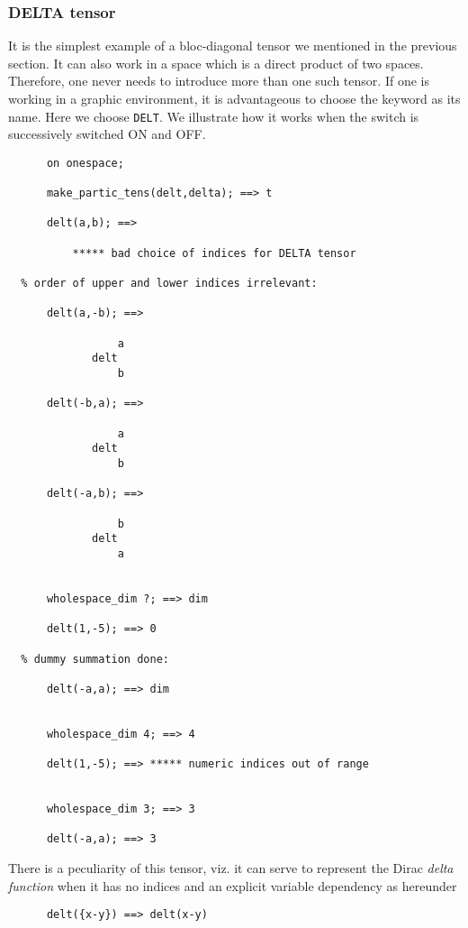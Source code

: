 \subsubsection{ DELTA tensor}
It is the simplest example of a bloc-diagonal
tensor we mentioned in the
previous section. It can also work in a space which is a direct product
of two spaces. Therefore, one never needs to introduce more than one
such tensor. If one is working in a graphic environment, it is advantageous
to choose the keyword as its name. Here we choose \texttt{DELT}.
We illustrate how it works  when the switch  is
successively switched ON and OFF.
\begin{verbatim}
      on onespace;

      make_partic_tens(delt,delta); ==> t

      delt(a,b); ==>

          ***** bad choice of indices for DELTA tensor

  % order of upper and lower indices irrelevant:

      delt(a,-b); ==>

                 a
             delt
                 b

      delt(-b,a); ==>

                 a
             delt
                 b

      delt(-a,b); ==>

                 b
             delt
                 a


      wholespace_dim ?; ==> dim

      delt(1,-5); ==> 0

  % dummy summation done:

      delt(-a,a); ==> dim


      wholespace_dim 4; ==> 4

      delt(1,-5); ==> ***** numeric indices out of range


      wholespace_dim 3; ==> 3

      delt(-a,a); ==> 3
\end{verbatim}
There is a peculiarity of this tensor, viz. it can serve to represent
the Dirac \emph{delta function}
 when it has no indices and an explicit variable dependency as hereunder
\begin{verbatim}
      delt({x-y}) ==> delt(x-y)
\end{verbatim}
